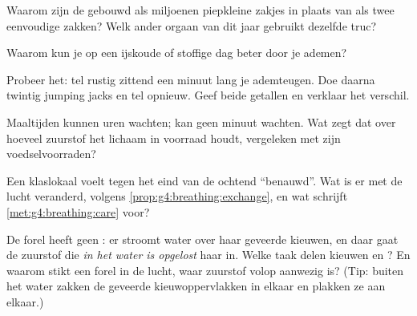 \begin{exercise}[$\star$]\label{exo:g4:breathing:6}
Waarom zijn de  gebouwd als miljoenen piepkleine zakjes in plaats
van als twee eenvoudige zakken? Welk ander orgaan van dit jaar gebruikt
dezelfde truc?
\end{exercise}

\begin{exercise}[$\star$]\label{exo:g4:breathing:7}
Waarom kun je op een ijskoude of stoffige dag beter door je  ademen?
\end{exercise}

\begin{exercise}[$\star$]\label{exo:g4:breathing:8}
Probeer het: tel rustig zittend een minuut lang je ademteugen. Doe
daarna twintig jumping jacks en tel opnieuw. Geef beide getallen en
verklaar het verschil.
\end{exercise}

\begin{exercise}[$\star\star$]\label{exo:g4:breathing:9}
Maaltijden kunnen uren wachten;  kan geen minuut wachten. Wat
zegt dat over hoeveel zuurstof het lichaam in voorraad houdt,
vergeleken met zijn voedselvoorraden?
\end{exercise}

\begin{exercise}[$\star\star$]\label{exo:g4:breathing:10}
Een klaslokaal voelt tegen het eind van de ochtend ``benauwd''. Wat is
er met de lucht veranderd, volgens \cref{prop:g4:breathing:exchange}, en
wat schrijft \cref{met:g4:breathing:care} voor?
\end{exercise}

\begin{exercise}[$\star\star\star$]\label{exo:g4:breathing:11}
De forel heeft geen : er stroomt water over haar geveerde kieuwen,
en daar gaat de zuurstof die \emph{in het water is opgelost} haar 
in. Welke taak delen kieuwen en ? En waarom stikt een forel in de
lucht, waar zuurstof volop aanwezig is? (Tip: buiten het water zakken de
geveerde kieuwoppervlakken in elkaar en plakken ze aan elkaar.)
\end{exercise}
